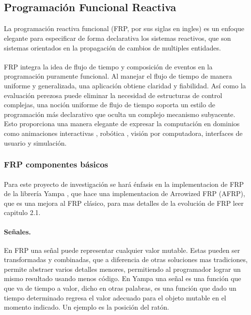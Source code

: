 \documentclass{standalone}
\begin{document}
\subsection{Programación Funcional Reactiva}

\paragraph{}
La programación reactiva funcional (FRP, por sus siglas en ingles) es un enfoque elegante para especificar de forma declarativa los sistemas reactivos, que son sistemas orientados en la propagación de cambios de multiples entidades.

\paragraph{}
FRP integra la idea de flujo de tiempo y composición de eventos en la programación puramente funcional. Al manejar el flujo de tiempo de manera uniforme y generalizada, una aplicación obtiene claridad y fiabilidad. Así como la evaluación perezosa puede eliminar la necesidad de estructuras de control complejas, una noción uniforme de flujo de tiempo soporta un estilo de programación más declarativo que oculta un complejo mecanismo subyacente. Esto proporciona una manera elegante de expresar la computación en dominios como animaciones interactivas \cite{eh97:fran}, robótica \cite{Pembeci:2002:FRR:571157.571174}, visión por computadora, interfaces de usuario \cite{czaplicki2012elm} y simulación.

\subsubsection{FRP componentes básicos}

\paragraph{}
Para este proyecto de investigación se hará énfasis en la implementacion de FRP de la librería Yampa \cite{Courtney2003b}, que hace una implementacion de Arrowized FRP (AFRP), que es una mejora al FRP clásico, para mas detalles de la evolución de FRP leer \cite{czaplicki2012elm} capitulo 2.1.

\paragraph{Señales.}
En FRP una señal puede representar cualquier valor mutable. Estas pueden ser transformadas y combinadas, que a diferencia de otras soluciones mas tradiciones, permite abstraer varios detalles menores, permitiendo al programador lograr un mismo resultado usando menos código. En Yampa una señal es una función que que va de tiempo a valor, dicho en otras palabras, es una función que dado un tiempo determinado regresa el valor adecuado para el objeto mutable en el momento indicado. Un ejemplo es la posición del ratón.
\end{document}
